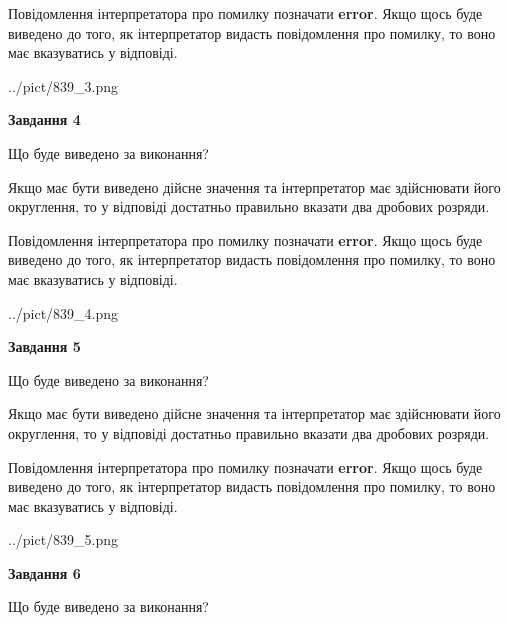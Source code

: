 \documentclass[12pt, ukrainian]{article}
\begin{document}
{\begin {Large}
Повідомлення інтерпретатора про помилку позначати \textbf{error}.
Якщо щось буде виведено до того, як інтерпретатор видасть повідомлення про помилку, 
то воно має вказуватись у відповіді. \par

\begin{center}
	{../pict/839_3.png}
\end{center}
\newpage

{\begin {center}\textbf{Завдання 4}\end {center}}\par
Що буде виведено за виконання? \par

Якщо має бути виведено дійсне значення та інтерпретатор має здійснювати його округлення, 
то у відповіді достатньо правильно вказати два дробових розряди.

Повідомлення інтерпретатора про помилку позначати \textbf{error}.
Якщо щось буде виведено до того, як інтерпретатор видасть повідомлення про помилку, 
то воно має вказуватись у відповіді. \par

\begin{center}
	{../pict/839_4.png}
\end{center}
\newpage

{\begin {center}\textbf{Завдання 5}\end {center}}\par
Що буде виведено за виконання? \par

Якщо має бути виведено дійсне значення та інтерпретатор має здійснювати його округлення, 
то у відповіді достатньо правильно вказати два дробових розряди.

Повідомлення інтерпретатора про помилку позначати \textbf{error}.
Якщо щось буде виведено до того, як інтерпретатор видасть повідомлення про помилку, 
то воно має вказуватись у відповіді. \par

\begin{center}
	{../pict/839_5.png}
\end{center}
\newpage

{\begin {center}\textbf{Завдання 6}\end {center}}\par
Що буде виведено за виконання? \par


\end{Large}}
\end{document}
